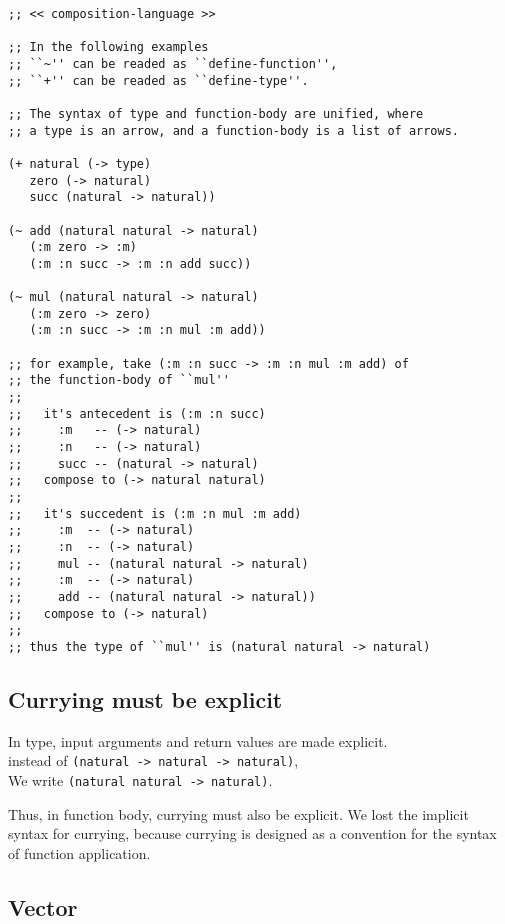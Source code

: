 \documentclass[numbers]{sigplanconf}
\begin{document}
\newpage

{\scriptsize\begin{verbatim}
;; << composition-language >>

;; In the following examples
;; ``~'' can be readed as ``define-function'',
;; ``+'' can be readed as ``define-type''.

;; The syntax of type and function-body are unified, where
;; a type is an arrow, and a function-body is a list of arrows.

(+ natural (-> type)
   zero (-> natural)
   succ (natural -> natural))

(~ add (natural natural -> natural)
   (:m zero -> :m)
   (:m :n succ -> :m :n add succ))

(~ mul (natural natural -> natural)
   (:m zero -> zero)
   (:m :n succ -> :m :n mul :m add))

;; for example, take (:m :n succ -> :m :n mul :m add) of
;; the function-body of ``mul''
;;
;;   it's antecedent is (:m :n succ)
;;     :m   -- (-> natural)
;;     :n   -- (-> natural)
;;     succ -- (natural -> natural)
;;   compose to (-> natural natural)
;;
;;   it's succedent is (:m :n mul :m add)
;;     :m  -- (-> natural)
;;     :n  -- (-> natural)
;;     mul -- (natural natural -> natural)
;;     :m  -- (-> natural)
;;     add -- (natural natural -> natural))
;;   compose to (-> natural)
;;
;; thus the type of ``mul'' is (natural natural -> natural)
\end{verbatim}}

\subsection{Currying must be explicit}

In type, input arguments and return values are made explicit. \\
instead of {\scriptsize\verb|(natural -> natural -> natural)|}, \\
We write {\scriptsize\verb|(natural natural -> natural)|}.

Thus, in function body, currying must also be explicit.
We lost the implicit syntax for currying,
because currying is designed as a convention
for the syntax of function application.

\subsection{Vector}
\end{document}
